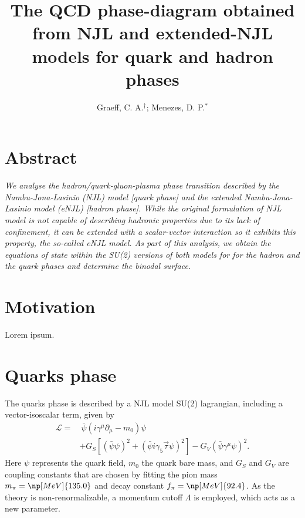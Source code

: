 \documentclass[plainsections,alongposter]{sciposterlocal}
\title{The QCD phase-diagram obtained from NJL and extended-NJL models for quark and hadron phases}
\author{Graeff, C. A.$^\dagger$; Menezes, D. P.$^*$}
\institute{$^\dagger$~Universidade Tecnológica Federal do Paraná -- Pato Branco, PR - Brazil \\
$^*$~Universidade Federal de Santa Catarina -- Florian\'opolis, SC - Brazil \\
}
\begin{document}
\maketitle %

\begin{multicols}{2} %

\section*{Abstract}
{ \it
We analyse the hadron/quark-gluon-plasma phase transition described by the Nambu-Jona-Lasinio (NJL) model [quark phase] and the extended Nambu-Jona-Lasinio model (eNJL) [hadron phase]. While the original formulation of NJL model is not capable of describing hadronic properties due to its lack of confinement, it can be extended with a scalar-vector interaction so it exhibits this property, the so-called  eNJL model. As part of this analysis, we obtain the equations of state within the SU(2) versions of both models for
for the hadron and the quark phases and determine the binodal surface. 
}

\section*{Motivation}

Lorem ipsum.


 
\section*{Quarks phase}

The quarks phase is described by a NJL model SU(2) lagrangian, including a vector-isoscalar term, given by\cite{Buballa2005}
\begin{equation*}\label{Eq:LagNJL-SU2-Bub}
\begin{split}
	\mathcal{L} =&~ \bar{\psi}(i\gamma^\mu\partial_\mu - m_0)\psi \\
	&+ G_S[(\bar{\psi}\psi)^2 + (\bar{\psi}i\gamma_5\vec{\tau}\psi)^2] - G_V(\bar{\psi}\gamma^\mu \psi)^2.
\end{split}
\end{equation*}
%
Here $\psi$ represents the quark field, $m_0$ the quark bare mass, and $G_S$ and $G_V$ are coupling constants that are chosen by fitting the pion mass $m_\pi = \np[MeV]{135.0}$ and decay constant $f_\pi = \np[MeV]{92.4}$. As the theory is non-renormalizable, a momentum cutoff $\Lambda$ is employed, which acts as a new parameter.


\end{multicols}
\end{document}
